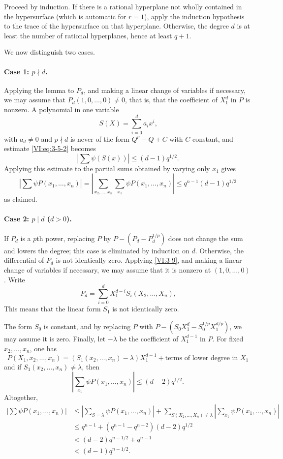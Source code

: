 \documentclass[12pt,oneside,english]{smfbook}
\begin{document}
Proceed by induction. If there is a rational hyperplane not wholly contained in the hypersurface (which is automatic for $r=1$), apply the induction hypothesis to the trace of the hypersurface on that hyperplane. Otherwise, the degree $d$ is at least the number of rational hyperplanes, hence at least $q+1$.

We now distinguish two cases.

\paragraph{Case 1: $p\nmid d$.}
Applying the lemma to $P_d$, and making a linear change of variables if necessary, we may assume that $P_d(1,0,\ldots,0)\ne0$, that is, that the coefficient of $X_1^d$ in $P$ is nonzero. A polynomial in one variable
\[
  S(X) = \sum_{i=0}^d a_i x^i \text{,}
\]
with $a_d\ne0$ and $p\nmid d$ is never of the form $Q^p-Q+C$ with $C$ constant, and estimate \eqref{VI:eq:3-5-2} becomes
\[
  \left| \sum \psi(S(x)) \right| \leqslant (d-1) q^{1/2} \text{.}
\]
Applying this estimate to the partial sums obtained by varying only $x_1$ gives
\[
  \left| \sum \psi P(x_1,\dots,x_n) \right| = \left| \sum_{x_2,\dots,x_n} \sum_{x_1} \psi P(x_1,\dots,x_n)\right| \leqslant q^{n-1} (d-1) q^{1/2}
\]
as claimed.

\paragraph{Case 2: $p\mid d$ ($d>0$).}
If $P_d$ is a $p$th power, replacing $P$ by $P-(P_d-P_d^{1/p})$ does not change the sum and lowers the degree; this case is eliminated by induction on $d$. Otherwise, the differential of $P_d$ is not identically zero. Applying \ref{VI:3-9}, and making a linear change of variables if necessary, we may assume that it is nonzero at $(1,0,\dotsc,0)$. Write
\[
  P_d = \sum_{i=0}^d X_1^{d-i} S_i(X_2,\dots,X_n) \text{,}
\]
This means that the linear form $S_1$ is not identically zero.

The form $S_0$ is constant, and by replacing $P$ with $P-(S_0X_1^d-S_0^{1/p}X_1^{d/p})$, we may assume it is zero. Finally, let $-\lambda$ be the coefficient of $X_1^{d-1}$ in $P$. For fixed $x_2,\dotsc,x_n$, one has
\[
  P(X_1,x_2,\dotsc,x_n)
  =(S_1(x_2,\dotsc,x_n)-\lambda)X_1^{d-1}
  +\text{terms of lower degree in $X_1$}
\]
and if $S_1(x_2,\dotsc,x_n)\ne\lambda$, then
\[
  \left| \sum_{x_1} \psi P(x_1,\dots,x_n)\right| \leqslant (d-2) q^{1/2} \text{.}
\]
Altogether,
\begin{align*}
  \left|\sum \psi P(x_1,\dots,x_n)\right|
    &\leqslant \left|\sum_{S=\lambda} \psi P(x_1,\dots,x_n)\right| + \sum_{S(X_2,\dots,X_n)\ne\lambda} \left| \sum_{x_1} \psi P(x_1,\dots,x_n)\right| \\
    &\leqslant q^{n-1} + (q^{n-1}-q^{n-2})(d-2) q^{1/2} \\
    &< (d-2) q^{n-1/2} + q^{n-1} \\
    &< (d-1) q^{n-1/2} \text{.}
\end{align*}
\end{document}
